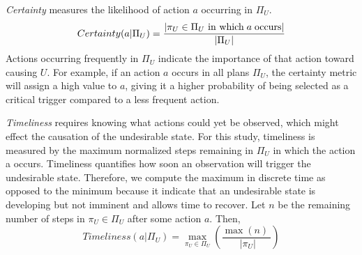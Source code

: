 {\it Certainty} measures the likelihood of action $a$ occurring in $\Pi_U$.
\begin{equation}
\label{eq:certainty}
Certainty (a|\Pi_U)  = \frac{|\pi_U \in \Pi_U \textup{ in which}\; a\; \textup{occurs}|}{|\Pi_U|}
\end{equation}
Actions occurring frequently in $\Pi_U$ indicate the importance of that action toward causing $U$. For example, if an action $a$ occurs in all plans $\Pi_U$, the certainty metric will assign a high value to $a$, giving it a higher probability of being selected as a critical trigger compared to a less frequent action. 

{\it Timeliness} requires knowing what actions could yet be observed, which might effect the causation of the undesirable state. 
For this study, timeliness is measured by the maximum normalized steps remaining in $\Pi_U$ in which the action a occurs. 
Timeliness quantifies how soon an observation will trigger the undesirable state. 
Therefore, we compute the maximum in discrete time as opposed to the minimum because it indicate that an undesirable state is developing but not imminent and allows time to recover. 
Let $n$ be the remaining number of steps in $\pi_U \in \Pi_U$ after some action $a$. Then,
\begin{equation}
\label{eq:timeliness}
Timeliness (a|\Pi_U) = \max_{\pi_U \in \Pi_U}\left(\frac{
	\max\left( n \right)\
	}{\; |\pi_U|}\right) 
\end{equation}


